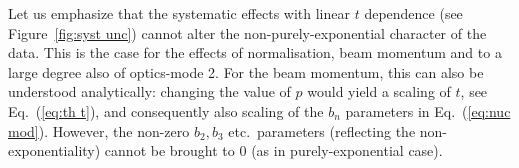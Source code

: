 Let us emphasize that the systematic effects with linear $t$ dependence (see Figure~\ref{fig:syst unc}) cannot alter the non-purely-exponential character of the data. This is the case for the effects of normalisation, beam momentum and to a large degree also of optics-mode 2. For the beam momentum, this can also be understood analytically: changing the value of $p$ would yield a scaling of $t$, see Eq.~(\ref{eq:th t}), and consequently also scaling of the $b_n$ parameters in Eq.~(\ref{eq:nuc mod}). However, the non-zero $b_2, b_3$ etc.~parameters (reflecting the non-exponentiality) cannot be brought to $0$ (as in purely-exponential case).

\fi
